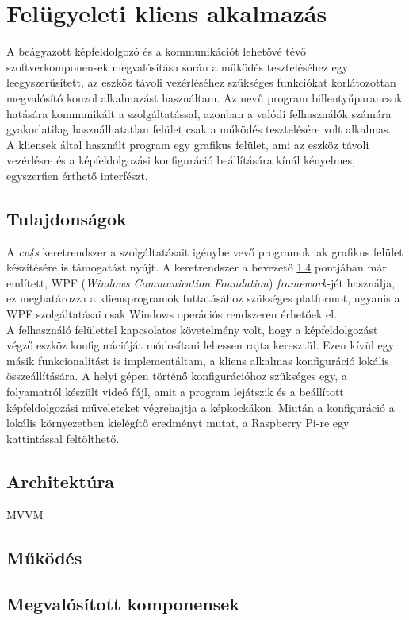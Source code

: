 \chapter{Felügyeleti kliens alkalmazás} \label{chapter:kliens}

A beágyazott képfeldolgozó és a kommunikációt lehetővé tévő szoftverkomponensek megvalósítása során a működés teszteléséhez egy leegyszerűsített, az eszköz távoli vezérléséhez szükséges funkciókat korlátozottan megvalósító konzol alkalmazást használtam. Az  nevű program billentyűparancsok hatására kommunikált a szolgáltatással, azonban a valódi felhasználók számára gyakorlatilag használhatatlan felület csak a működés tesztelésére volt alkalmas.\\
A kliensek által használt program egy grafikus felület, ami az eszköz távoli vezérlésre és a képfeldolgozási konfiguráció beállítására kínál kényelmes, egyszerűen érthető interfészt.

\section{Tulajdonságok}

A \emph{cv4s} keretrendszer a szolgáltatásait igénybe vevő programoknak grafikus felület készítésére is támogatást nyújt. A keretrendszer a bevezető \ref{} pontjában már említett, WPF (\emph{Windows Communication Foundation}) \emph{framework}-jét használja, ez meghatározza a kliensprogramok futtatásához szükséges platformot, ugyanis a WPF szolgáltatásai csak Windows operációs rendszeren érhetőek el. \\
A felhasználó felülettel kapcsolatos követelmény volt, hogy a képfeldolgozást végző eszköz konfigurációját módosítani lehessen rajta keresztül. Ezen kívül egy másik funkcionalitást is implementáltam, a kliens alkalmas konfiguráció lokális összeállítására. A helyi gépen történő konfigurációhoz szükséges egy, a folyamatról készült videó fájl, amit a program lejátszik és a beállított képfeldolgozási műveleteket végrehajtja a képkockákon. Miután a konfiguráció a lokális környezetben kielégítő eredményt mutat, a Raspberry Pi-re egy kattintással feltölthető.\\


\section{Architektúra}

MVVM

\section{Működés}

\section{Megvalósított komponensek}
